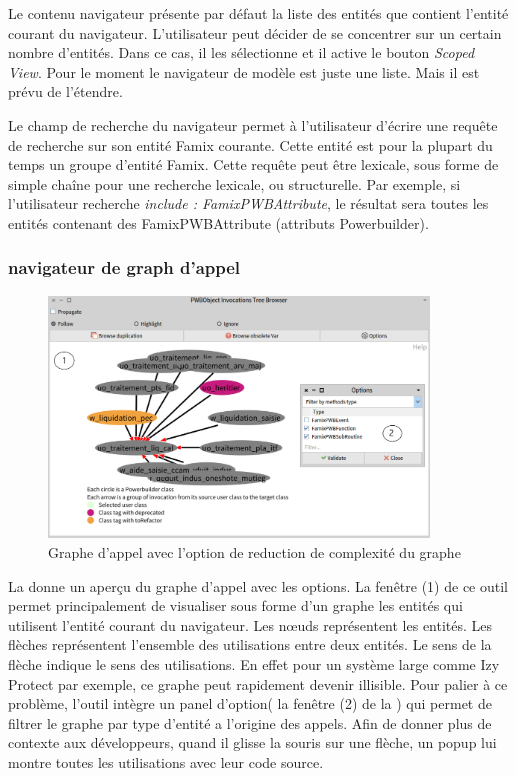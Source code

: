 \documentclass[a4paper]{article}
\begin{document}
Le contenu navigateur présente par défaut la liste des entités que contient l'entité courant du navigateur. 
L'utilisateur peut décider de se concentrer sur un certain nombre d'entités. Dans ce cas, il les sélectionne et il active le bouton \textit{Scoped View}.
Pour le moment le navigateur de modèle est juste une liste. Mais il est prévu de l'étendre.

Le champ de recherche du navigateur permet à l'utilisateur d'écrire une requête de recherche sur son entité Famix courante.
Cette entité est pour la plupart du temps un groupe d'entité Famix.
Cette requête peut être lexicale, sous forme de simple chaîne pour une recherche lexicale, ou structurelle.
Par exemple, si l'utilisateur recherche \textit{include : FamixPWBAttribute}, le résultat sera toutes les entités contenant des FamixPWBAttribute (attributs Powerbuilder).

\subsubsection{navigateur de graph d'appel}
\begin{figure}[htbp]
  \begin{center}
  \includegraphics[width=0.9\textwidth]{./figures/callGraphBrowser.png}
  \caption{Graphe d'appel avec l'option de reduction de complexité du graphe}
  \label{fig:graphAppel}
\end{center}
\vspace{-0.3cm}
\end{figure}
La  donne un aperçu du graphe d'appel avec les options.  
 La fenêtre (1) de ce outil permet principalement de visualiser sous forme d'un graphe les entités qui utilisent l'entité courant du navigateur.
Les nœuds représentent les entités. Les flèches représentent l'ensemble des utilisations entre deux entités.
Le sens de la flèche indique le sens des utilisations.
En effet pour un système large comme Izy Protect par exemple, ce graphe peut rapidement devenir illisible. 
Pour palier à ce problème, l'outil intègre un panel d'option( la fenêtre (2) de la ) qui permet de filtrer le graphe par type d'entité a l'origine des appels.
Afin de donner plus de contexte aux développeurs, quand il glisse la souris sur une flèche, un popup lui montre toutes les utilisations avec leur code source.
\end{document}
